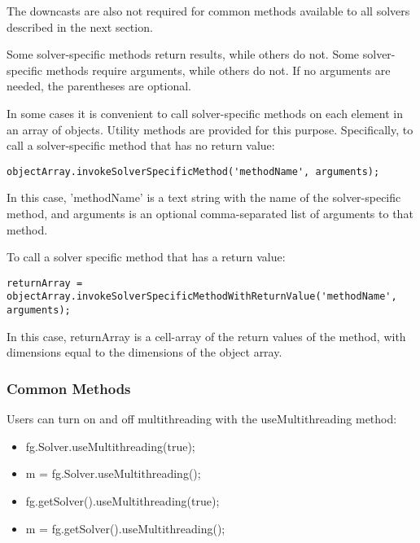 The downcasts are also not required for common methods available to all solvers described in the next section.
\fi

Some solver-specific methods return results, while others do not.  Some solver-specific methods require arguments, while others do not.  \ifmatlab If no arguments are needed, the parentheses are optional. \fi

\ifmatlab

In some cases it is convenient to call solver-specific methods on each element in an array of objects.  Utility methods are provided for this purpose.  Specifically, to call a solver-specific method that has no return value:
\begin{lstlisting}
objectArray.invokeSolverSpecificMethod('methodName', arguments);
\end{lstlisting}

In this case, 'methodName' is a text string with the name of the solver-specific method, and arguments is an optional comma-separated list of arguments to that method.

To call a solver specific method that has a return value:
\begin{lstlisting}
returnArray = objectArray.invokeSolverSpecificMethodWithReturnValue('methodName', arguments);
\end{lstlisting}

In this case, returnArray is a cell-array of the return values of the method, with dimensions equal to the dimensions of the object array.

\fi

\subsubsection{Common Methods}


Users can turn on and off multithreading with the useMultithreading method:

\ifmatlab
\begin{itemize}
\item fg.Solver.useMultithreading(true);
\item m = fg.Solver.useMultithreading();
\end{itemize}
\fi

\ifjava
\begin{itemize}
\item fg.getSolver().useMultithreading(true);
\item m = fg.getSolver().useMultithreading();
\end{itemize}
\fi

